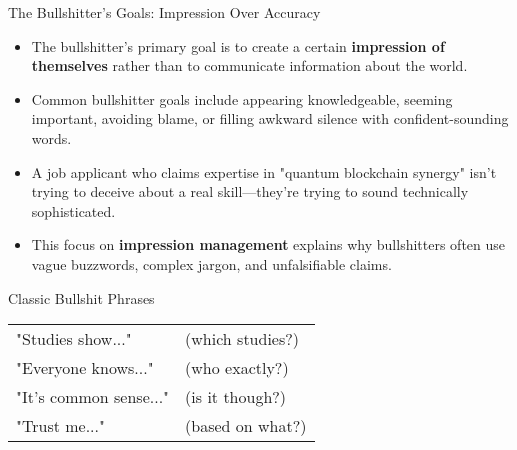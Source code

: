 \documentclass{beamer}
\begin{document}
	\begin{frame}{The Bullshitter's Goals: Impression Over Accuracy}
		\begin{itemize}
			\item The bullshitter's primary goal is to create a certain \textbf{impression of themselves} rather than to communicate information about the world.
			\item Common bullshitter goals include appearing knowledgeable, seeming important, avoiding blame, or filling awkward silence with confident-sounding words.
			\item A job applicant who claims expertise in "quantum blockchain synergy" isn't trying to deceive about a real skill—they're trying to sound technically sophisticated.
			\item This focus on \textbf{impression management} explains why bullshitters often use vague buzzwords, complex jargon, and unfalsifiable claims.
		\end{itemize}
		
		\begin{block}{Classic Bullshit Phrases}
			\begin{tabular}{ll}
				"Studies show..." & (which studies?) \\
				"Everyone knows..." & (who exactly?) \\
				"It's common sense..." & (is it though?) \\
				"Trust me..." & (based on what?) \\
			\end{tabular}
		\end{block}
	\end{frame}
	
\end{document}
